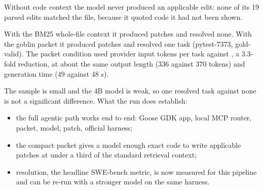 Without code context the model never produced an applicable edit: none of its 19 parsed edits matched the file,
because it quoted code it had not been shown.

With the BM25 whole-file context it produced \EtoeBmPatches{} patches and resolved none. With the goblin packet it
produced \EtoeGoblinPatches{} patches and resolved one task (pytest-7373, gold-valid). The packet condition used
\EtoeGoblinInput{} provider input tokens per task against \EtoeBmInput{}, a 3.3-fold reduction, at about the same
output length (336 against 370 tokens) and generation time (49 against 48 s).

The sample is small and the 4B model is weak, so one resolved task against none is not a significant difference.
What the run does establish:
\begin{itemize}
\item the full agentic path works end to end: Goose GDK app, local MCP router, packet, model, patch, official
harness;
\item the compact packet gives a model enough exact code to write applicable patches at under a third of the
standard retrieval context;
\item resolution, the headline SWE-bench metric, is now measured for this pipeline and can be re-run with a stronger
model on the same harness.
\end{itemize}
